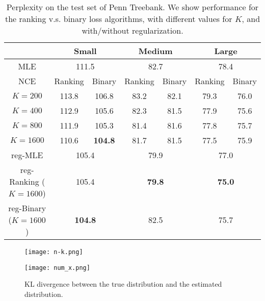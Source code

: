 \documentclass[11pt,a4paper]{article}
\begin{document}
\begin{table*}[t!]
\centering
\begin{small}
\begin{tabular}{|c|c|c|c|c|c|c|}
\hline
&   \multicolumn{2}{|c|}{Small}  &  \multicolumn{2}{|c|}{Medium}  &  \multicolumn{2}{|c|}{Large} \\
\hline
MLE  &  \multicolumn{2}{|c|}{111.5} & \multicolumn{2}{|c|}{82.7}   & \multicolumn{2}{|c|}{78.4}\\
\hline
 NCE   &Ranking &Binary         &Ranking &Binary   &Ranking &Binary   \\
 \hline
$K = 200$   & 113.8 & 106.8     & 83.2  & 82.1        & 79.3        &76.0   \\
\hline
$K = 400$   & 112.9 & 105.6     & 82.3  & 81.5        & 77.9      &75.6   \\
\hline
$K = 800$   & 111.9 & 105.3     & 81.4  & 81.6        & 77.8       &75.7   \\
\hline
$K = 1600$  & 110.6 & \textbf{104.8} & 81.7  & 81.5   & 77.5  &75.9   \\
\hline
reg-MLE      & \multicolumn{2}{|c|}{105.4}   &\multicolumn{2}{|c|}{79.9}     & \multicolumn{2}{|c|}{77.0} \\
\hline
reg-Ranking ($K = 1600$)  & \multicolumn{2}{|c|}{105.4}   &\multicolumn{2}{|c|}{\textbf{79.8}}     & \multicolumn{2}{|c|}{\textbf{75.0}} \\
\hline
reg-Binary ($K = 1600$)  & \multicolumn{2}{|c|}{\textbf{104.8}}  &\multicolumn{2}{|c|}{82.5}     & \multicolumn{2}{|c|}{75.7} \\
\hline
\end{tabular}
\end{small}
\caption{Perplexity on the test set of Penn Treebank. We show performance for
the ranking v.s. binary loss algorithms, with different values for $K$,
and with/without regularization.}
\label{table:lm-test}
\end{table*}

\begin{figure*}[t!]
\begin{minipage}{0.5\textwidth}
\texttt{[image: n-k.png]}
\end{minipage}
\hspace{-1.5em}
\begin{minipage}{0.5\textwidth}
\texttt{[image: num\_x.png]}
\end{minipage}
\caption{KL divergence between the true distribution and the estimated distribution.}
\label{fig:sim}
\end{figure*}
\end{document}
